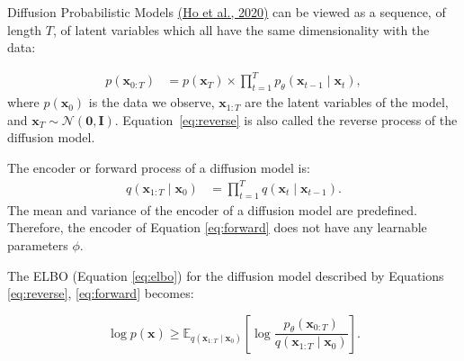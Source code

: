 \documentclass[11pt,addpoints,answers]{exam}
\newcommand{\xv}{\mathbf{x}}
\begin{document}
\begin{questions}
Diffusion Probabilistic Models \href{https://arxiv.org/pdf/2006.11239.pdf}{(Ho et al., 2020)} can be viewed as a sequence, of length $T$, of latent variables which all have the same dimensionality with the data:

\begin{align}
p(\xv_{0:T}) &= p(\xv_T) \times \prod_{t=1}^{T}p_{\theta}(\xv_{t-1} \mid \xv_t),
\label{eq:reverse}
\end{align}
where $p(\xv_0)$ is the data we observe, $\xv_{1:T}$ are the latent variables of the model, and $\xv_T \sim \mathcal{N}(\boldsymbol{0},\boldsymbol{I})$. Equation~\eqref{eq:reverse} is also called the reverse process of the diffusion model.

The encoder or forward process of a diffusion model is:
\begin{align}
q(\xv_{1:T}\mid \xv_0) &=  \prod_{t=1}^{T}q(\xv_{t} \mid \xv_{t-1}).
\label{eq:forward}
\end{align}
The mean and variance of the encoder of a diffusion model are predefined. Therefore, the encoder of Equation \ref{eq:forward} does not have any learnable parameters $\phi$.

The ELBO (Equation \ref{eq:elbo}) for the diffusion model described by Equations \ref{eq:reverse}, \ref{eq:forward} becomes:

\begin{equation}
   \log p(\xv) \ge \mathbb{E}_{q(\xv_{1:T}\mid \xv_0)}\left[\log \frac{p_\theta(\xv_{0:T})}{q(\xv_{1:T}\mid \xv_0)}\right].
    \label{eq:elbo_diffusion}
\end{equation}

\clearpage


\end{questions}
\end{document}
